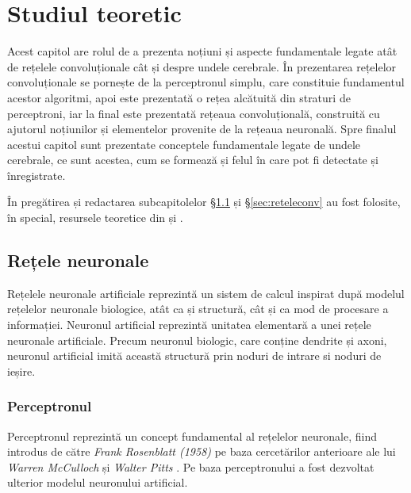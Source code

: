 \chapter{Studiul teoretic}\label{ch:2studiu_teoretic}
Acest capitol are rolul de a prezenta noțiuni și aspecte fundamentale legate atât de rețelele convoluționale cât și despre undele cerebrale. În prezentarea rețelelor convoluționale se pornește de la perceptronul simplu, care constituie fundamentul acestor algoritmi, apoi este prezentată o rețea alcătuită din straturi de perceptroni, iar la final este prezentată rețeaua convoluțională, construită cu ajutorul noțiunilor și elementelor provenite de la rețeaua neuronală. Spre finalul acestui capitol sunt prezentate conceptele fundamentale legate de undele cerebrale, ce sunt acestea, cum se formează și felul în care pot fi detectate și înregistrate.

În pregătirea și redactarea subcapitolelor \S\ref{sec:reteleneuronale} și \S\ref{sec:reteleconv} au fost folosite, în special, resursele teoretice din \cite{neuralnetbook:2015} și \cite{vrejoiu:2019}.

\section{Rețele neuronale}\label{sec:reteleneuronale}
Rețelele neuronale artificiale reprezintă un sistem de calcul inspirat după modelul rețelelor neuronale biologice, atât ca și structură, cât și ca mod de procesare a informației. Neuronul artificial reprezintă unitatea elementară a unei rețele neuronale artificiale. Precum neuronul biologic, care conține dendrite și axoni, neuronul artificial imită această structură prin noduri de intrare si noduri de ieșire.

\subsection{Perceptronul}
Perceptronul reprezintă un concept fundamental al rețelelor neuronale, fiind introdus de către \textit{Frank Rosenblatt (1958)} \cite{rosenblatt1962principles} pe baza cercetărilor anterioare ale lui \textit{Warren McCulloch} și \textit{Walter Pitts} \cite{McCulloch:427611}. Pe baza perceptronului a fost dezvoltat ulterior modelul neuronului artificial.

